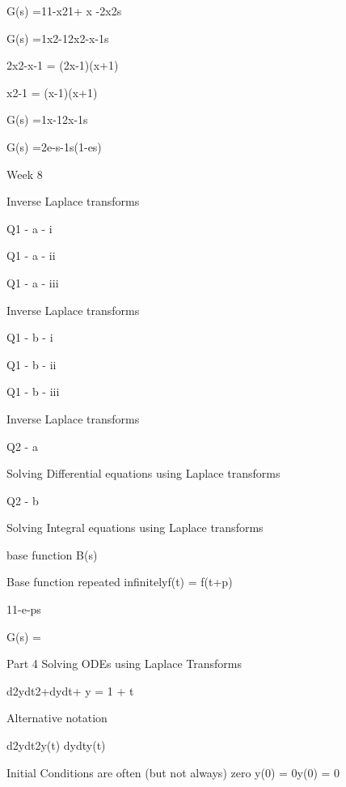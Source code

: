  

G(s) =11-x21+ x -2x2s

 

G(s) =1x2-12x2-x-1s

 

2x2-x-1 = (2x-1)(x+1)

x2-1 = (x-1)(x+1)

 

 

G(s) =1x-12x-1s 

 

G(s) =2e-s-1s(1-es)

Week 8


Inverse Laplace transforms


Q1 - a - i


Q1 - a - ii


Q1 - a - iii


Inverse Laplace transforms


Q1 - b - i


Q1 - b - ii


Q1 - b - iii

Inverse Laplace transforms



Q2 - a

Solving Differential equations using Laplace transforms


Q2 - b 

Solving Integral equations using Laplace transforms



base function B(s)


Base function repeated infinitelyf(t) = f(t+p)


11-e-ps


G(s)  = 


 

Part 4 Solving ODEs using Laplace Transforms 

 

d2ydt2+dydt+ y = 1 + t 

 

Alternative notation

 

d2ydt2y(t)                dydty(t)


Initial Conditions are often (but not always) zero    y(0) = 0y(0) = 0

 

 

